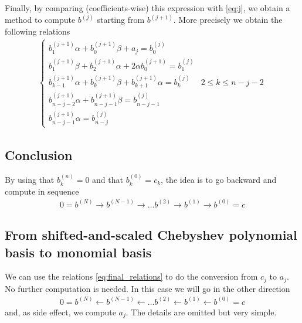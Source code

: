 \documentclass[a4paper,10pt]{article}
\theoremstyle{plain}
\begin{document}
Finally, by comparing (coefficients-wise) this expression with \eqref{eq:j}, we obtain a method to compute $b^{(j)}$ starting from $b^{(j+1)}$. More precisely we obtain the following relations
\begin{align} \label{eq:final_relations}
 \begin{cases}
  b^{(j+1)}_{1} \alpha + b^{(j+1)}_{0} \beta + a_j = b^{(j)}_{0}	\\
  b^{(j+1)}_{1} \beta + b^{(j+1)}_{2} \alpha + 2 \alpha b^{(j+1)}_{0} = b^{(j)}_{1}	\\
  b^{(j+1)}_{k-1} \alpha + b^{(j+1)}_{k} \beta + b^{(j+1)}_{k+1} \alpha = b^{(j)}_{k}	& 2 \le k \le n-j-2	\\
  b^{(j+1)}_{n-j-2} \alpha + b^{(j+1)}_{n-j-1} \beta = b^{(j)}_{n-j-1}	\\
  b^{(j+1)}_{n-j-1} \alpha = b^{(j)}_{n-j} 
 \end{cases}
\end{align}

\subsection{Conclusion}
By using that $b^{(n)}_{k}=0$ and that $b^{(0)}_{k}=c_k$, the idea is to go backward and compute in sequence 
\begin{align*}
 0=b^{(N)} \rightarrow 
 b^{(N-1)} \rightarrow 
 \dots 
 b^{(2)} \rightarrow 
 b^{(1)} \rightarrow 
 b^{(0)}
 =c
\end{align*}

\subsection{From shifted-and-scaled Chebyshev polynomial basis to monomial basis}
We can use the relations \eqref{eq:final_relations} to do the conversion from $c_j$ to $a_j$. No further computation is needed. In this case we will go in the other direction 
\begin{align*}
 0=b^{(N)} \leftarrow 
 b^{(N-1)} \leftarrow 
 \dots 
 b^{(2)} \leftarrow 
 b^{(1)} \leftarrow 
 b^{(0)}
 =c
\end{align*}
and, as side effect, we compute $a_j$. The details are omitted but very simple.
\end{document}
